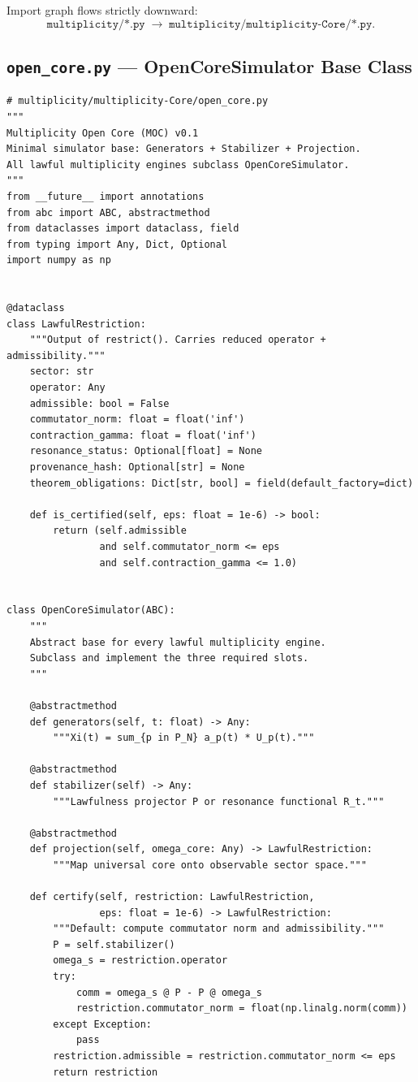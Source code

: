 \documentclass[12pt,a4paper]{article}
\theoremstyle{plain}
\theoremstyle{definition}
\theoremstyle{remark}
\begin{document}
\medskip
Import graph flows strictly downward:
\[
  \texttt{multiplicity/*.py} \;\longrightarrow\;
  \texttt{multiplicity/multiplicity-Core/*.py}.
\]

\subsection{\texttt{open\_core.py} --- OpenCoreSimulator Base Class}
\label{sec:open-core-code}

\begin{lstlisting}[caption={multiplicity/multiplicity-Core/open\_core.py},
  label=lst:opencore]
# multiplicity/multiplicity-Core/open_core.py
"""
Multiplicity Open Core (MOC) v0.1
Minimal simulator base: Generators + Stabilizer + Projection.
All lawful multiplicity engines subclass OpenCoreSimulator.
"""
from __future__ import annotations
from abc import ABC, abstractmethod
from dataclasses import dataclass, field
from typing import Any, Dict, Optional
import numpy as np


@dataclass
class LawfulRestriction:
    """Output of restrict(). Carries reduced operator + admissibility."""
    sector: str
    operator: Any
    admissible: bool = False
    commutator_norm: float = float('inf')
    contraction_gamma: float = float('inf')
    resonance_status: Optional[float] = None
    provenance_hash: Optional[str] = None
    theorem_obligations: Dict[str, bool] = field(default_factory=dict)

    def is_certified(self, eps: float = 1e-6) -> bool:
        return (self.admissible
                and self.commutator_norm <= eps
                and self.contraction_gamma <= 1.0)


class OpenCoreSimulator(ABC):
    """
    Abstract base for every lawful multiplicity engine.
    Subclass and implement the three required slots.
    """

    @abstractmethod
    def generators(self, t: float) -> Any:
        """Xi(t) = sum_{p in P_N} a_p(t) * U_p(t)."""

    @abstractmethod
    def stabilizer(self) -> Any:
        """Lawfulness projector P or resonance functional R_t."""

    @abstractmethod
    def projection(self, omega_core: Any) -> LawfulRestriction:
        """Map universal core onto observable sector space."""

    def certify(self, restriction: LawfulRestriction,
                eps: float = 1e-6) -> LawfulRestriction:
        """Default: compute commutator norm and admissibility."""
        P = self.stabilizer()
        omega_s = restriction.operator
        try:
            comm = omega_s @ P - P @ omega_s
            restriction.commutator_norm = float(np.linalg.norm(comm))
        except Exception:
            pass
        restriction.admissible = restriction.commutator_norm <= eps
        return restriction
\end{lstlisting}
\end{document}
